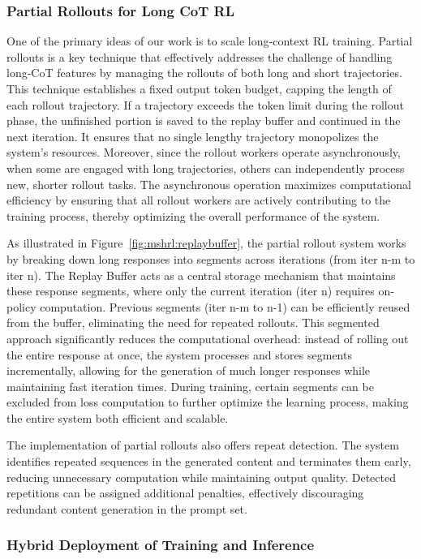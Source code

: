 \documentclass{article}
\begin{document}
\subsubsection{Partial Rollouts for Long CoT RL}
One of the primary ideas of our work is to scale long-context RL training. Partial rollouts is a key technique that effectively addresses the challenge of handling long-CoT features by managing the rollouts of both long and short trajectories. This technique establishes a fixed output token budget, capping the length of each rollout trajectory. If a trajectory exceeds the token limit during the rollout phase, the unfinished portion is saved to the replay buffer and continued in the next iteration. It ensures that no single lengthy trajectory monopolizes the system's resources. Moreover, since the rollout workers operate asynchronously, when some are engaged with long trajectories, others can independently process new, shorter rollout tasks. The asynchronous operation maximizes computational efficiency by ensuring that all rollout workers are actively contributing to the training process, thereby optimizing the overall performance of the system.

As illustrated in Figure~\ref{fig:mshrl:replaybuffer}, the partial rollout system works by breaking down long responses into segments across iterations (from iter n-m to iter n). The Replay Buffer acts as a central storage mechanism that maintains these response segments, where only the current iteration (iter n) requires on-policy computation. Previous segments (iter n-m to n-1) can be efficiently reused from the buffer, eliminating the need for repeated rollouts. This segmented approach significantly reduces the computational overhead: instead of rolling out the entire response at once, the system processes and stores segments incrementally, allowing for the generation of much longer responses while maintaining fast iteration times. During training, certain segments can be excluded from loss computation to further optimize the learning process, making the entire system both efficient and scalable.

The implementation of partial rollouts also offers repeat detection. The system identifies repeated sequences in the generated content and terminates them early, reducing unnecessary computation while maintaining output quality. 
Detected repetitions can be assigned additional penalties, effectively discouraging redundant content generation in the prompt set.

\subsubsection{Hybrid Deployment of Training and Inference}
\end{document}
